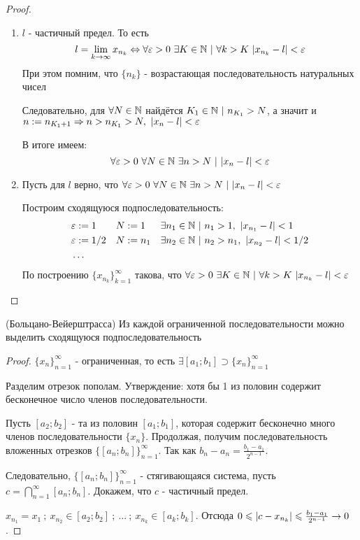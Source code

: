 \begin{proof}
\begin{enumerate}
	\item $l$ - частичный предел. То есть 
	$$
		l = \liml_{k \to \infty} x_{n_k} \lra \forall \eps > 0\ \exists K \in \N\ |\ \forall k > K\ |x_{n_k} - l| < \eps
	$$
	При этом помним, что $\{n_k\}$ - возрастающая последовательность натуральных чисел
	
	Следовательно, для $\forall N \in \mathbb{N}$ найдётся $K_1 \in \mathbb{N}\ |\ n_{K_1} > N$, а значит и $n := n_{K_1 + 1} \Rightarrow n > n_{K_1} > N,\ |x_n - l| < \varepsilon$
	
	В итоге имеем:
	$$
		\forall \eps > 0\ \forall N \in \N\ \exists n > N\ |\ |x_n - l| < \eps
	$$
	\item Пусть для $l$ верно, что $\forall \varepsilon > 0\ \forall N \in \mathbb{N}\ \exists n > N\ |\ |x_n - l| < \varepsilon$
	
	Построим сходящуюся подпоследовательность:
	\begin{align*}
		&\eps := 1 & &N := 1 & &\exists n_1 \in \N\ |\ n_1 > 1,\ |x_{n_1} - l| < 1
		\\
		&\eps := 1/2 & &N := n_1 & &\exists n_2 \in \N\ |\ n_2 > n_1,\ |x_{n_2} - l| < 1/2
		\\
		&\dots
	\end{align*}
	По построению $\{x_{n_k}\}_{k = 1}^\infty$ такова, что
	$\forall \varepsilon > 0\ \exists K \in \mathbb{N}\ |\ \forall k > K\ |x_{n_k} - l| < \varepsilon$
\end{enumerate}
\end{proof}

\begin{theorem} (Больцано-Вейерштрасса)
	Из каждой ограниченной последовательности можно выделить сходящуюся подпоследовательность
\end{theorem}

\begin{proof}
	$\{x_n\}_{n = 1}^\infty$ - ограниченная, то есть $\exists [a_1; b_1] \supset \{x_n\}_{n = 1}^\infty$
	
	Разделим отрезок пополам. Утверждение: хотя бы 1 из половин содержит бесконечное число членов последовательности.
	
	Пусть $[a_2; b_2]$ - та из половин $[a_1; b_1]$, которая содержит бесконечно много членов последовательности $\{x_n\}$. Продолжая, получим последовательность вложенных отрезков $\{[a_n; b_n]\}_{n = 1}^\infty$. Так как $b_n - a_n = \frac{b_1 - a_1}{2^{n - 1}}$.
	
	Следовательно, $\{[a_n; b_n]\}_{n = 1}^\infty$ - стягивающаяся система, пусть $c = \bigcap\limits_{n = 1}^\infty [a_n; b_n]$. Докажем, что $c$ - частичный предел.
	
	$x_{n_1} = x_1\ ;\ x_{n_2} \in [a_2; b_2]\ ;\ \dots\ ;\ x_{n_k} \in [a_k; b_k]$. Отсюда $0 \leqslant |c - x_{n_k}| \leqslant \frac{b_1 - a_1}{2^{n - 1}} \rightarrow 0$.
\end{proof}

